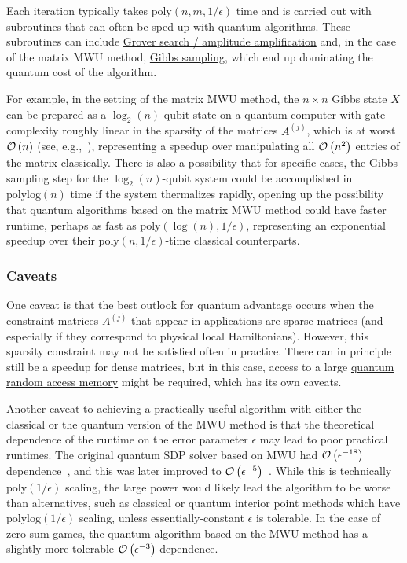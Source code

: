 \begin{refsection}
Each iteration typically takes $\text{poly}(n,m,1/\epsilon)$ time 
and is carried out with subroutines that can often be sped up with quantum algorithms. These subroutines can include \hyperref[prim:AA]{Grover search / amplitude amplification} and, in the case of the matrix MWU method, \hyperref[prim:GibbsSampling]{Gibbs sampling}, which end up dominating the quantum cost of the algorithm. 

For example, in the setting of the matrix MWU method, the $n \times n$ Gibbs state $X$
can be prepared as a $\log_2(n)$-qubit state on a quantum computer with gate complexity roughly linear in the sparsity of the matrices $A^{(j)}$, which is at worst $\mathcal{O}\left( n \right)$ (see, e.g.,~\cite{apeldoorn2017QSDPSolvers}), representing a speedup over manipulating all $\mathcal{O}\left( n^2 \right)$ entries of the matrix classically. There is also a possibility that for specific cases, the Gibbs sampling step for the $\log_2(n)$-qubit system could be accomplished in $\text{polylog}(n)$ time if the system thermalizes rapidly, opening up the possibility that quantum algorithms based on the matrix MWU method could have faster runtime, perhaps as fast as $\mathrm{poly}(\log(n),1/\epsilon)$, representing an exponential speedup over their $\mathrm{poly}(n,1/\epsilon)$-time classical counterparts. 



\subsubsection*{Caveats}

One caveat is that the best outlook for quantum advantage occurs when the constraint matrices $A^{(j)}$ that appear in applications are sparse matrices (and especially if they correspond to physical local Hamiltonians). However, this sparsity constraint may not be satisfied often in practice. There can in principle still be a speedup for dense matrices, but in this case, access to a large \hyperref[prim:QRAM]{quantum random access memory} might be required, which has its own caveats. 

Another caveat to achieving a practically useful algorithm with either the classical or the quantum version of the MWU method is that the theoretical dependence of the runtime on the error parameter $\epsilon$ may lead to poor practical runtimes. The original quantum SDP solver based on MWU had $\mathcal{O}\left( \epsilon^{-18} \right)$ dependence~\cite{brandao2016QSDPSpeedup}, and this was later improved to $\mathcal{O}\left( \epsilon^{-5} \right)$~\cite{apeldoorn2018ImprovedQSDPSolving}. While this is technically $\mathrm{poly}(1/\epsilon)$ scaling, the large power would likely lead the algorithm to be worse than alternatives, such as classical or quantum interior point methods which have $\mathrm{polylog}(1/\epsilon)$ scaling, unless essentially-constant $\epsilon$ is tolerable. In the case of \hyperref[appl:ZeroSumGames]{zero sum games}, the quantum algorithm based on the MWU method has a slightly more tolerable $\mathcal{O}\left( \epsilon^{-3} \right)$ dependence. 


\end{refsection}
